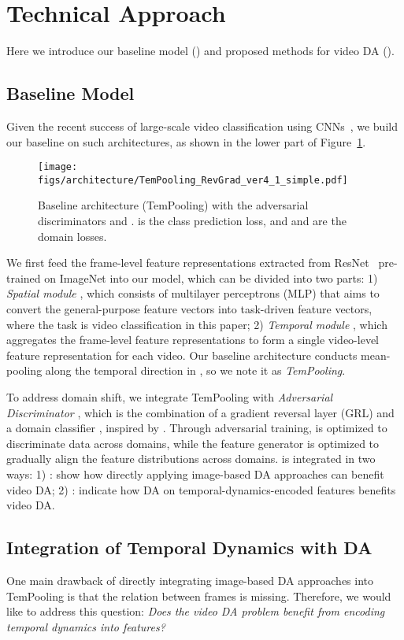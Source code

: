 \documentclass[10pt,twocolumn,letterpaper]{article}
\begin{document}
\section{Technical Approach}
Here we introduce our baseline model () and proposed methods for video DA ().

\subsection{Baseline Model} \label{sec:baseline}
Given the recent success of large-scale video classification using CNNs~\cite{karpathy2014large}, we build our baseline on such architectures, as shown in the lower part of Figure~\ref{fig:TemPooling_RevGrad}. 

\begin{figure}[!ht]
\centering
\texttt{[image: figs/architecture/TemPooling\_RevGrad\_ver4\_1\_simple.pdf]}
\caption{Baseline architecture (TemPooling) with the adversarial discriminators  and .  is the class prediction loss, and  and  are the domain losses. 
}
\label{fig:TemPooling_RevGrad}
\end{figure}

We first feed the 
frame-level feature representations extracted from ResNet~\cite{he2016deep} pre-trained on ImageNet into our model, 
which can be divided into two parts: 1) \textit{Spatial module }, 
which consists of multilayer perceptrons (MLP) that aims to convert the general-purpose feature vectors into task-driven feature vectors, where the task is video classification in this paper; 
2) \textit{Temporal module }, which aggregates the frame-level feature representations to form a single video-level feature representation for each video. Our baseline architecture conducts mean-pooling along the temporal direction in , so we note it as \textit{TemPooling}.

To address domain shift, we integrate TemPooling with \textit{Adversarial Discriminator }, which is the combination of a gradient reversal layer (GRL) and a domain classifier , inspired by \cite{ganin2015unsupervised}. Through adversarial training,  is optimized to discriminate data across domains, while the feature generator is optimized to gradually align the feature distributions across domains. 
 is integrated in two ways: 1) : show how directly applying image-based DA approaches can benefit video DA; 2) : indicate how DA on temporal-dynamics-encoded features benefits video DA. 

\subsection{Integration of Temporal Dynamics with DA} \label{sec:TAAN}
One main drawback of directly integrating image-based DA approaches into TemPooling
is that the relation between frames is missing. 
Therefore, we would like to address this question: \textit{Does the video DA problem benefit from encoding temporal dynamics into features?} 
\end{document}
